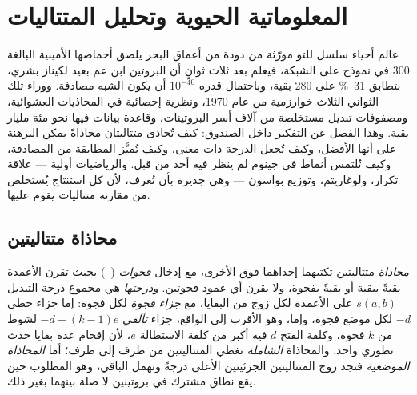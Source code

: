 \chapter{المعلوماتية الحيوية وتحليل المتتاليات}\label{ch:b3:bioinformatics}

عالم أحياء سلسل للتو مورّثة من دودة من أعماق البحر يلصق
أحماضها الأمينية البالغة \num{300} في نموذج على الشبكة، فيعلم بعد
ثلاث ثوانٍ أن البروتين ابن عم بعيد لكيناز بشري، بتطابق
\qty{31}{\%} على \num{280} بقية، وباحتمال قدره
$10^{-40}$ أن يكون الشبه مصادفة. ووراء تلك الثواني الثلاث
خوارزمية  من عام 1970، ونظرية إحصائية في
المحاذيات العشوائية، ومصفوفات تبديل مستخلصة من آلاف
أسر البروتينات، وقاعدة بيانات فيها نحو مئة مليار بقية.
وهذا الفصل عن التفكير داخل الصندوق: كيف تُحاذى متتاليتان
محاذاةً يمكن البرهنة على أنها الأفضل، وكيف تُجعل الدرجة ذات
معنى، وكيف تُميَّز المطابقة من المصادفة، وكيف تُلتمس أنماط في
جينوم لم ينظر فيه أحد من قبل. والرياضيات أولية --- علاقة تكرار،
ولوغاريتم، وتوزيع بواسون --- وهي جديرة بأن تُعرف، لأن كل
استنتاج يُستخلص من مقارنة متتاليات يقوم عليها.

\section{محاذاة متتاليتين}

\begin{definition}\label{def:b3:bioinformatics:alignment}
\emph{محاذاة} متتاليتين تكتبهما إحداهما فوق الأخرى، مع إدخال
\emph{فجوات} (--) بحيث تقرن الأعمدة بقيةً ببقية أو بقيةً
بفجوة، ولا يقرن أي عمود فجوتين. و\emph{درجتها}
هي مجموع درجة التبديل $s(a,b)$ على الأعمدة
لكل زوج من البقايا، مع \emph{جزاء فجوة} لكل فجوة: إما
جزاء خطي $-d$ لكل موضع فجوة، وإما، وهو الأقرب إلى الواقع،
جزاء \emph{تآلفي} $-d - (k-1)e$ لشوط من $k$ فجوة، وكلفة
الفتح $d$ فيه أكبر من كلفة الاستطالة $e$، لأن إقحام
عدة بقايا حدث تطوري واحد. والمحاذاة
\emph{الشاملة} تغطي المتتاليتين من طرف إلى طرف؛ أما \emph{المحاذاة
الموضعية} فتجد زوج المتتاليتين الجزئيتين الأعلى درجةً وتهمل
الباقي، وهو المطلوب حين يقع نطاق مشترك في بروتينين
لا صلة بينهما بغير ذلك.
\end{definition}

